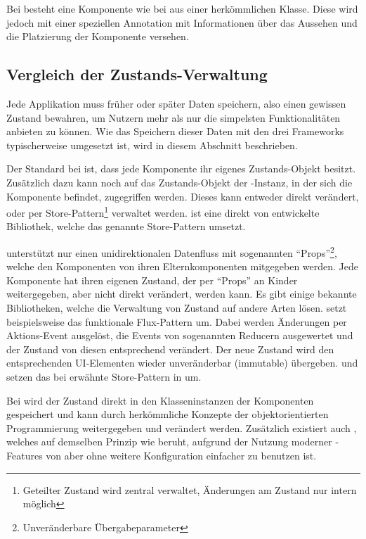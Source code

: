 Bei  besteht eine Komponente wie bei  aus einer herkömmlichen Klasse. Diese wird jedoch mit einer speziellen Annotation mit Informationen über das Aussehen und die Platzierung der Komponente versehen.



\subsection{Vergleich der Zustands-Verwaltung}
Jede Applikation muss früher oder später Daten speichern, also einen gewissen Zustand bewahren, um Nutzern mehr als nur die simpelsten Funktionalitäten anbieten zu können. Wie das Speichern dieser Daten mit den drei Frameworks typischerweise umgesetzt ist, wird in diesem Abschnitt beschrieben.

Der Standard bei  ist, dass jede Komponente ihr eigenes Zustands-Objekt besitzt. Zusätzlich dazu kann noch auf das Zustands-Objekt der -Instanz, in der sich die Komponente befindet, zugegriffen werden. Dieses kann entweder direkt verändert, oder per Store-Pattern\footnote{Geteilter Zustand wird zentral verwaltet, Änderungen am Zustand nur intern möglich} verwaltet werden.  ist eine direkt von  entwickelte Bibliothek, welche das genannte Store-Pattern umsetzt.

 unterstützt nur einen unidirektionalen Datenfluss mit sogenannten \enquote{Props}\footnote{Unveränderbare Übergabeparameter}, welche den Komponenten von ihren Elternkomponenten mitgegeben werden. Jede Komponente hat ihren eigenen Zustand, der per \enquote{Props} an Kinder weitergegeben, aber nicht direkt verändert, werden kann. Es gibt einige bekannte Bibliotheken, welche die Verwaltung von Zustand auf andere Arten lösen.  setzt beispielsweise das funktionale Flux-Pattern um. Dabei werden Änderungen per Aktions-Event ausgelöst, die Events von sogenannten Reducern ausgewertet und der Zustand von diesen entsprechend verändert. Der neue Zustand wird den entsprechenden UI-Elementen wieder unveränderbar (immutable) übergeben.  und  setzen das bei  erwähnte Store-Pattern in  um.

Bei  wird der Zustand direkt in den Klasseninstanzen der Komponenten gespeichert und kann durch herkömmliche Konzepte der objektorientierten Programmierung weitergegeben und verändert werden. Zusätzlich existiert auch , welches auf demselben Prinzip wie  beruht, aufgrund der Nutzung moderner -Features von  aber ohne weitere Konfiguration einfacher zu benutzen ist.

